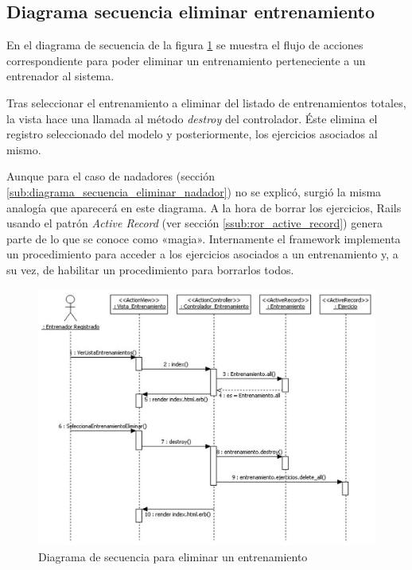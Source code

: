 		\newpage
		
		\subsection{Diagrama secuencia eliminar entrenamiento} %
		  \label{sub:diagrama_secuencia_eliminar_entrenamiento}
		
		  En el diagrama de secuencia de la figura \ref{fig:di_sec_eliminarentrenamiento} se muestra el flujo de acciones correspondiente para poder eliminar un entrenamiento perteneciente a un entrenador al sistema.
		  
		  Tras seleccionar el entrenamiento a eliminar del listado de entrenamientos totales, la vista hace una llamada al método {\it destroy} del controlador. Éste elimina el registro seleccionado del modelo y posteriormente, los ejercicios asociados al mismo.
		  
		  Aunque para el caso de nadadores (sección \ref{sub:diagrama_secuencia_eliminar_nadador}) no se explicó, surgió la misma analogía que aparecerá en este diagrama. A la hora de borrar los ejercicios, Rails usando el patrón {\it Active Record} (ver sección \ref{ssub:ror_active_record}) genera parte de lo que se conoce como «magia». Internamente el framework implementa un procedimiento para acceder a los ejercicios asociados a un entrenamiento y, a su vez, de habilitar un procedimiento para borrarlos todos.
		  
		  \begin{figure}[H]
			  \centering
			    \includegraphics[width=15cm]{./eps/di_diagsecuencia/Entrenamiento_Eliminar.eps}
			  \caption{Diagrama de secuencia para eliminar un entrenamiento}
			  \label{fig:di_sec_eliminarentrenamiento}
			\end{figure}
		
